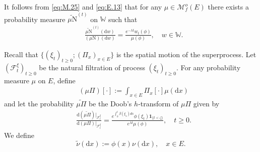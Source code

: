 \documentclass[12pt,a4paper]{amsart}
\numberwithin{equation}{section}
\theoremstyle{plain}
\theoremstyle{definition}
\theoremstyle{remark}
\begin{document}
	It follows from \eqref{eq:M.25} and \eqref{eq:E.13} that for any $\mu\in \mathcal M^o_f(E)$ there exists a probability measure $\widetilde {\mu \mathrm N}^{(t)}$ on $\mathbb W$ such that
	\begin{align}\label{eq:E.15}
	& \frac{\widetilde {\mu \mathrm N}^{(t)}(\mathrm dw) }{(\mu \mathrm N)(\mathrm dw)}
	= \frac{e^{-\lambda t}w_t(\phi)}{\mu(\phi)}, \quad w\in \mathbb W.
	\end{align}
	
	Recall that $\{(\xi_t)_{t\geq 0}; (\Pi_x)_{x\in E}\}$ is the spatial motion of the superprocess.
	Let  $(\mathscr F_t^{\xi})_{t\geq 0}$ be the natural filtration of process $(\xi_t)_{t\geq 0}$.
	For any probability measure $\mu$ on $E$, define
\begin{align}
	& (\mu \Pi)[\cdot] := 
	\int_{x\in E} \Pi_x[\cdot]\mu(\mathrm dx)
\end{align}
and let the probability $\widetilde {\mu \Pi}$ be the Doob's $h$-transform of $\mu\Pi$ given by
\begin{align}
	&  \frac{\mathrm d (\widetilde{\mu \Pi})|_{\mathscr F^\xi_t}}{\mathrm d (\mu \Pi)|_{\mathscr F^\xi_t}}
	=\frac{e^{\int_0^t \beta(\xi_s)ds}\phi(\xi_t) \mathbf 1_{\{t<\zeta\}}}{e^{\lambda t}\mu(\phi)},
	\quad t\geq 0.
\end{align}
%
We define
\[
\widetilde \nu(\mathrm dx) := \phi(x) \nu(\mathrm dx), \quad x\in E.
\]
\end{document}
